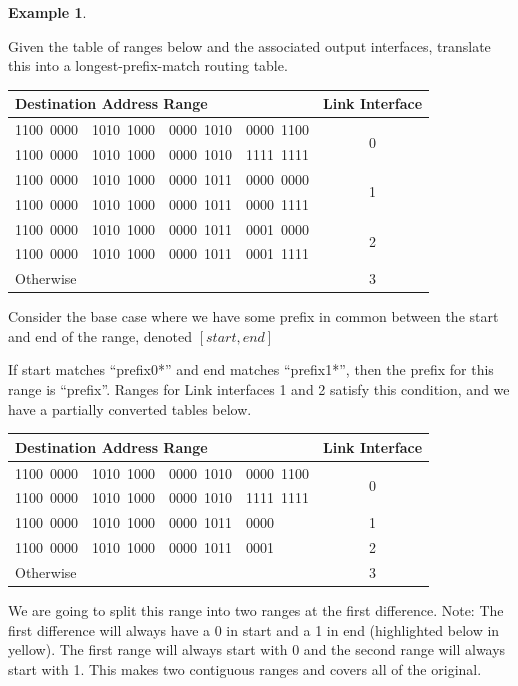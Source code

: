 \documentclass[pdf,bookmarks,colorlinks=true]{article}
\theoremstyle{definition}
\newtheorem{example}{Example}[section]
\begin{document}
\begin{example}\label{ex:1}

Given the table of ranges below and the associated output interfaces, translate this into a longest-prefix-match routing table.\bigskip

\begin{center}
\begin{tabular}{|l|c|}\hline
	Destination Address Range &  Link Interface \\ \hline
	1100~0000~~1010~1000~~0000~1010~~0000~1100 & \multirow{2}{*}{0} \\
	1100~0000~~1010~1000~~0000~1010~~1111~1111 & \\ \hline
	1100~0000~~1010~1000~~0000~1011~~0000~0000 & \multirow{2}{*}{1} \\
	1100~0000~~1010~1000~~0000~1011~~0000~1111 & \\ \hline
	1100~0000~~1010~1000~~0000~1011~~0001~0000 & \multirow{2}{*}{2} \\
	1100~0000~~1010~1000~~0000~1011~~0001~1111 & ~\\ \hline 
	Otherwise & 3 \\ \hline
\end{tabular}\bigskip
\end{center}

Consider the base case where we have some prefix in common between the start and end of the range, denoted $[start, end]$

If start matches ``prefix0*'' and end matches ``prefix1*'', then the prefix for this range is ``prefix''. Ranges for Link interfaces 1 and 2 satisfy this condition, and we have a partially converted tables below.\bigskip

\begin{center}
\begin{tabular}{|l|c|}\hline
	Destination Address Range &  Link Interface \\ \hline
	1100~0000~~1010~1000~~0000~1010~~0000~1100 & \multirow{2}{*}{0} \\
	1100~0000~~1010~1000~~0000~1010~~1111~1111 & \\ \hline
	1100~0000~~1010~1000~~0000~1011~~0000 & 1 \\ \hline
	1100~0000~~1010~1000~~0000~1011~~0001 & 2 \\ \hline
	Otherwise & 3 \\ \hline
\end{tabular}\bigskip
\end{center}

We are going to split this range into two ranges at the first difference. Note: The first difference will always have a 0 in start and a 1 in end (highlighted below in yellow). The first range will always start with 0 and the second range will always start with 1. This makes two contiguous ranges and covers all of the original.\bigskip 


\end{example}
\end{document}
